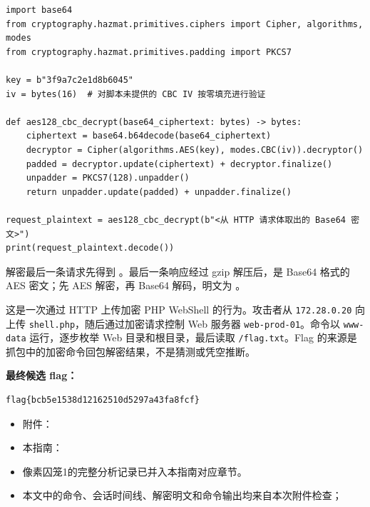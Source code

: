 \begin{verbatim}
import base64
from cryptography.hazmat.primitives.ciphers import Cipher, algorithms, modes
from cryptography.hazmat.primitives.padding import PKCS7

key = b"3f9a7c2e1d8b6045"
iv = bytes(16)  # 对脚本未提供的 CBC IV 按零填充进行验证

def aes128_cbc_decrypt(base64_ciphertext: bytes) -> bytes:
    ciphertext = base64.b64decode(base64_ciphertext)
    decryptor = Cipher(algorithms.AES(key), modes.CBC(iv)).decryptor()
    padded = decryptor.update(ciphertext) + decryptor.finalize()
    unpadder = PKCS7(128).unpadder()
    return unpadder.update(padded) + unpadder.finalize()

request_plaintext = aes128_cbc_decrypt(b"<从 HTTP 请求体取出的 Base64 密文>")
print(request_plaintext.decode())
\end{verbatim}

解密最后一条请求先得到 \texttt{}。最后一条响应经过 gzip 解压后，是 Base64 格式的 AES 密文；先 AES 解密，再 Base64 解码，明文为 \texttt{}。

这是一次通过 HTTP 上传加密 PHP WebShell 的行为。攻击者从 \texttt{172.28.0.20} 向 \texttt{} 上传 \texttt{shell.php}，随后通过加密请求控制 Web 服务器 \texttt{web-prod-01}。命令以 \texttt{www-data} 运行，逐步枚举 Web 目录和根目录，最后读取 \texttt{/flag.txt}。Flag 的来源是抓包中的加密命令回包解密结果，不是猜测或凭空推断。

\textbf{最终候选 flag：}

\begin{verbatim}
flag{bcb5e1538d12162510d5297a43fa8fcf}
\end{verbatim}

\begin{itemize}
\tightlist
\item
  附件：\texttt{}
\item
  本指南：\texttt{}
\item
  像素囚笼1的完整分析记录已并入本指南对应章节。
\item
  本文中的命令、会话时间线、解密明文和命令输出均来自本次附件检查；
\end{itemize}

